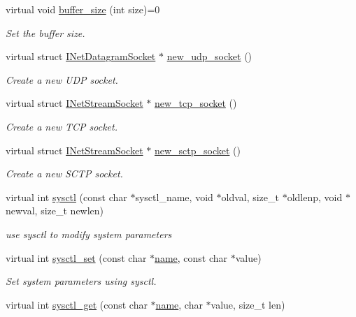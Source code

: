 \begin{DoxyCompactItemize}
virtual void \hyperlink{structINetStack_a62459a1b7e52395f643b00c4c17336a0}{buffer\+\_\+size} (int size)=0
\begin{DoxyCompactList}\small\item\em Set the buffer size. \end{DoxyCompactList}\item 
virtual struct \hyperlink{structINetDatagramSocket}{I\+Net\+Datagram\+Socket} $\ast$ \hyperlink{structINetStack_aa60d96b381e97cc1bd06d3de8797b802}{new\+\_\+udp\+\_\+socket} ()
\begin{DoxyCompactList}\small\item\em Create a new U\+DP socket. \end{DoxyCompactList}\item 
virtual struct \hyperlink{structINetStreamSocket}{I\+Net\+Stream\+Socket} $\ast$ \hyperlink{structINetStack_a6379ab96d754f8cefa330ba186bb6b2a}{new\+\_\+tcp\+\_\+socket} ()
\begin{DoxyCompactList}\small\item\em Create a new T\+CP socket. \end{DoxyCompactList}\item 
virtual struct \hyperlink{structINetStreamSocket}{I\+Net\+Stream\+Socket} $\ast$ \hyperlink{structINetStack_af4593b1f78902bc5a5c0f655ed33dd82}{new\+\_\+sctp\+\_\+socket} ()
\begin{DoxyCompactList}\small\item\em Create a new S\+C\+TP socket. \end{DoxyCompactList}\item 
virtual int \hyperlink{structINetStack_a0a438f5ca8eea27a04997801e9bc37c3}{sysctl} (const char $\ast$sysctl\+\_\+name, void $\ast$oldval, size\+\_\+t $\ast$oldlenp, void $\ast$newval, size\+\_\+t newlen)
\begin{DoxyCompactList}\small\item\em use sysctl to modify system parameters \end{DoxyCompactList}\item 
virtual int \hyperlink{structINetStack_ad237b6c2a8d492e07fbb6db85feabdda}{sysctl\+\_\+set} (const char $\ast$\hyperlink{generate__test__data__lte__spectrum__model_8m_ab74e6bf80237ddc4109968cedc58c151}{name}, const char $\ast$value)
\begin{DoxyCompactList}\small\item\em Set system parameters using sysctl. \end{DoxyCompactList}\item 
virtual int \hyperlink{structINetStack_a396b535a199299a904f52e00d0dbf590}{sysctl\+\_\+get} (const char $\ast$\hyperlink{generate__test__data__lte__spectrum__model_8m_ab74e6bf80237ddc4109968cedc58c151}{name}, char $\ast$value, size\+\_\+t len)

\end{DoxyCompactItemize}
